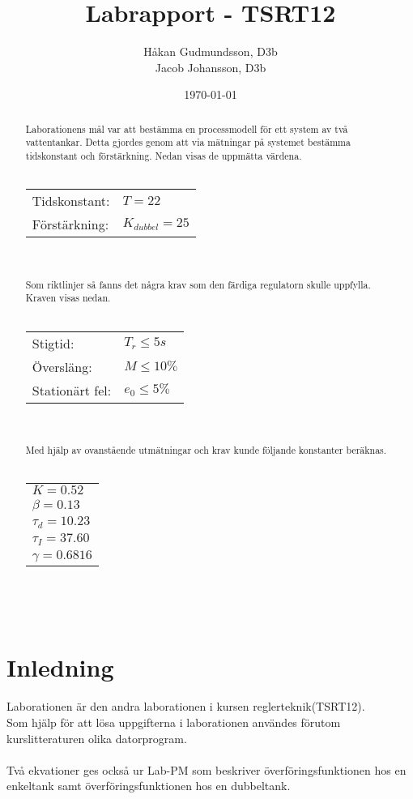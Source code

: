 \documentclass[a4paper]{article}
\title{Labrapport - TSRT12}
\author{Håkan Gudmundsson, D3b \\ Jacob Johansson, D3b}
\date{\today}
\begin{document}
\maketitle
\newpage

\begin{abstract}

Laborationens mål var att bestämma en processmodell för ett system av två vattentankar.
Detta gjordes genom att via mätningar på systemet bestämma tidskonstant och förstärkning.
Nedan visas de uppmätta värdena.
\\\\
\begin{tabular}{l l}
  Tidskonstant: & $T = 22$ \\
  Förstärkning: & $K_{dubbel} = 25$ 
\end{tabular}
\\\\
Som riktlinjer så fanns det några krav som den färdiga regulatorn skulle uppfylla.
Kraven visas nedan.
\\\\
\begin{tabular}{l l}
  Stigtid: & $T_{r} \leq 5s$ \\
  Översläng: & $M \leq 10\%$ \\
  Stationärt fel: & $e_{0} \leq 5\% $ 
\end{tabular}
\\\\
Med hjälp av ovanstående utmätningar och krav kunde följande konstanter beräknas.
\\\\
\begin{tabular}{l}
  $K = 0.52$ \\
  $\beta = 0.13$ \\
  $\tau_{d} = 10.23$ \\
  $\tau_{I} = 37.60$ \\
  $\gamma = 0.6816$ 
\end{tabular}
\\\\
\end{abstract}

\newpage
\tableofcontents
\newpage

\section{Inledning}

Laborationen är den andra laborationen i kursen reglerteknik(TSRT12). \\
Som hjälp för att lösa uppgifterna i laborationen användes förutom kurslitteraturen olika datorprogram. 
\\\\
Två ekvationer ges också ur Lab-PM som beskriver överföringsfunktionen hos en enkeltank samt överföringsfunktionen hos en dubbeltank.
\end{document}
